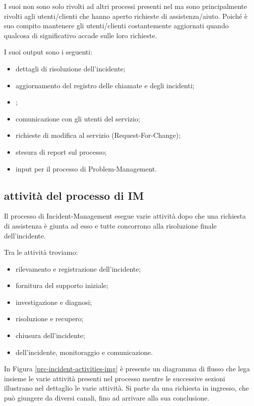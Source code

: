 I suoi  non sono solo rivolti ad altri processi presenti nel  ma sono principalmente rivolti agli utenti/clienti che hanno aperto richieste di assistenza/aiuto. Poiché è suo compito mantenere gli utenti/clienti costantemente aggiornati quando qualcosa di significativo accade sulle loro richieste.

I suoi output sono i seguenti:

\begin{itemize}
\item{dettagli di risoluzione dell'incidente;}
\item{aggiornamento del registro delle chiamate e degli incidenti;}
\item{;}
\item{comunicazione con gli utenti del servizio;}
\item{richieste di modifica al servizio (\ac{Request-For-Change});}
\item{stesura di report sul processo;}
\item{input per il processo di \ac{Problem-Management}.}
\end{itemize}

\subsection[Attività del processo di IM]{attività del processo di IM}
\label{prc-incident-activities}
Il processo di \ac{Incident-Management} esegue varie attività dopo che una richiesta di assistenza è giunta ad esso e tutte concorrono alla risoluzione finale dell'incidente.

Tra le attività troviamo:

\begin{itemize}
\item{rilevamento e registrazione dell'incidente;}
\item{fornitura del supporto iniziale;}
\item{investigazione e diagnosi;}
\item{risoluzione e recupero;}
\item{chiusura dell'incidente;}
\item{ dell'incidente, monitoraggio e comunicazione.}
\end{itemize}

In Figura \ref{prc-incident-activities-img} è presente un diagramma di flusso che lega insieme le varie attività presenti nel processo mentre le successive sezioni illustrano nel dettaglio le varie attività. Si parte da una richiesta in ingresso, che può giungere da diversi canali, fino ad arrivare alla sua conclusione.


